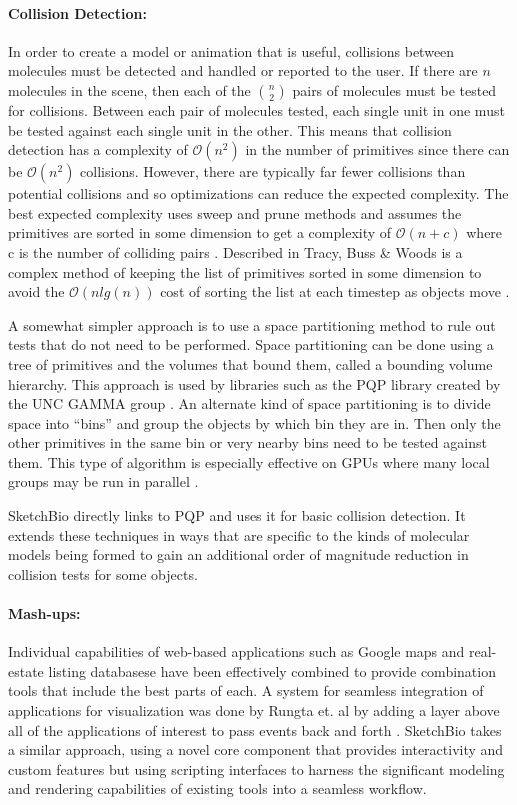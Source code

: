 \documentclass[twocolumn]{bmcart}%
\begin{document}
\paragraph*{Collision Detection:}
In order to create a model or animation that is useful, collisions between molecules must be detected and handled or reported to the user.  If there are $n$ molecules in the scene, then each of the $n\choose 2$ pairs of molecules must be tested for collisions.  Between each pair of molecules tested, each single unit in one must be tested against each single unit in the other.  This means that collision detection has a complexity of $\mathcal{O}(n^2)$ in the number of primitives since there can be $\mathcal{O}(n^2)$ collisions.  However, there are typically far fewer collisions than potential collisions and so optimizations can reduce the expected complexity.  The best expected complexity uses sweep and prune methods and assumes the primitives are sorted in some dimension to get a complexity of $\mathcal{O}(n + c)$ where c is the number of colliding pairs \cite{tracy2009efficient}.  Described in Tracy, Buss \& Woods is a complex method of keeping the list of primitives sorted in some dimension to avoid the $\mathcal{O}(n lg(n))$ cost of sorting the list at each timestep as objects move \cite{tracy2009efficient}.

A somewhat simpler approach is to use a space partitioning method to rule out tests that do not need to be performed.  Space partitioning can be done using a tree of primitives and the volumes that bound them, called a bounding volume hierarchy.  This approach is used by libraries such as the PQP library created by the UNC GAMMA group \cite{PQP}.  An alternate kind of space partitioning is to divide space into “bins” and group the objects by which bin they are in.  Then only the other primitives in the same bin or very nearby bins need to be tested against them.  This type of algorithm is especially effective on GPUs where many local groups may be run in parallel \cite{oat2008efficient}.

SketchBio directly links to PQP and uses it for basic collision detection.  It extends these techniques in ways that are specific to the kinds of molecular models being formed to gain an additional order of magnitude reduction in collision tests for some objects.

\paragraph*{Mash-ups:}
Individual capabilities of web-based applications such as Google maps and real-estate listing databasese have been effectively combined to provide combination tools that include the best parts of each.  A system for seamless integration of applications for visualization was done by Rungta et. al by adding a layer above all of the applications of interest to pass events back and forth \cite{rungta2013manyvis}.  SketchBio takes a similar approach, using a novel core component that provides interactivity and custom features but using scripting interfaces to harness the significant modeling and rendering capabilities of existing tools into a seamless workflow.
\end{document}
